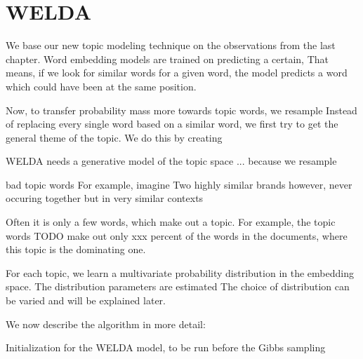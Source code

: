 \documentclass[
        a4paper,
        titlepage,
        twoside,
        parskip
        ]{scrbook}
\theoremstyle{break}
\begin{document}
\section{WELDA}
We base our new topic modeling technique on the observations from the last chapter.
Word embedding models are trained on predicting a certain,
That means, if we look for similar words for a given word, the model predicts a word which could have been at the same position.

Now, to transfer probability mass more towards topic words, we resample 
Instead of replacing every single word based on a similar word, we first try to get the general theme of the topic.
We do this by creating 

WELDA needs a generative model of the topic space ... because we resample


bad topic words
For example, imagine
Two highly similar brands
however, never occuring together
but in very similar contexts

Often it is only a few words, which make out a topic.
For example, the topic words TODO make out only xxx percent of the words in the documents, where this topic is the dominating one.

For each topic, we learn a multivariate probability distribution in the embedding space.
The distribution parameters are estimated
The choice of distribution can be varied and will be explained later.

We now describe the algorithm in more detail:

\begin{algorithm}
  \caption{Initialization for the WELDA model, to be run before the Gibbs sampling}
  \label{alg:welda_init}
  \begin{algorithmic}[1]
    \EndFor
    \EndProcedure
  \end{algorithmic}
\end{algorithm}
\end{document}
